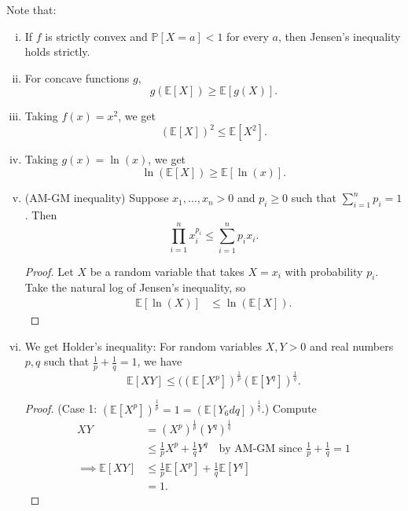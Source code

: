 \documentclass{tufte-handout}
\newcommand*\E{\mathbb{E}}
\renewcommand{\P}{\mathbb{P}}
\theoremstyle{definition}
\begin{document}
Note that:
\begin{enumerate}[(i)]
	\item If $f$ is strictly convex and $\P\left[X = a\right] < 1$ for every $a$, then Jensen's inequality holds strictly. 
	\item For concave functions $g$, \[
		g(\E\left[X\right] ) \ge \E\left[g(X)\right] 
	.\] 
	\item Taking $f(x) = x^2$, we get \[
			\left( \E\left[X\right]  \right)^2 \le \E\left[X^2\right] 
	.\] 
	\item Taking $g(x) = \ln{(x)}$, we get \[
			\ln{(\E\left[X\right] )} \ge \E\left[\ln{(x)}\right] 
	.\] 
	\item (AM-GM inequality) Suppose $x_1,\ldots,x_n >0$ and $p_i \ge 0$ such that $\sum\limits_{i=1}^{n} p_i = 1$. Then \[
		\prod_{i=1}^{n} x_i^{p_i} \le \sum\limits_{i=1}^{n} p_i x_i
	.\] 
	\begin{proof}
		Let $X$ be a random variable that takes $X = x_i$ with probability $p_i$. Take the natural log of Jensen's inequality, so
		\begin{align*}
			\E\left[\ln{(X)}\right] &\le \ln{(\E\left[X\right] )}
		.\end{align*}
	\end{proof}
	\item We get Holder's inequality: For random variables $X,Y > 0$ and real numbers $p,q$ such that $\frac{1}{p} + \frac{1}{q} = 1$, we have \[
		\E\left[XY\right] \le (\left( \E\left[X^{p}\right]  \right)^{\frac{1}{p}} \left( \E\left[Y^{q}\right]  \right)^{\frac{1}{q}}
	.\] 
	\begin{proof}
		(Case 1: $\left( \E\left[X^{p}\right]  \right)^{\frac{1}{p}} = 1 = \left( \E\left[Y_6dq\right]  \right)^{\frac{1}{q}}$.) Compute
		\begin{align*}
			XY &= (X^p)^{\frac{1}{p}} \left( Y^q \right)^{\frac{1}{q}} \\
			   &\le \frac{1}{p} X^{p} + \frac{1}{q} Y^q \quad \text{by AM-GM since $\frac{1}{p} + \frac{1}{q} = 1$} \\
			\implies \E\left[XY\right]  &\le \frac{1}{p} \E\left[X^p\right] + \frac{1}{q} \E\left[Y^q\right] \\
			&= 1
		.\end{align*}
		

\end{proof}
\end{enumerate}
\end{document}
